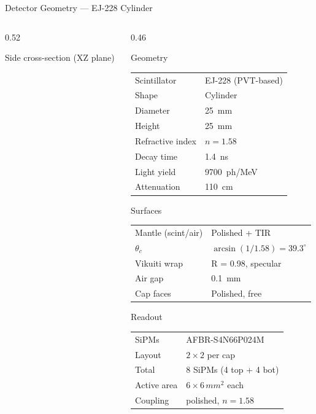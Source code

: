 \documentclass[aspectratio=169,10pt]{beamer}
\begin{document}
\begin{frame}{Detector Geometry — EJ-228 Cylinder}
\begin{columns}[T]
\begin{column}{0.52\textwidth}

  \vspace{0.3em}
  {\footnotesize Side cross-section (XZ plane)}
  \end{column}

  \begin{column}{0.46\textwidth}
  \small
  \begin{block}{Geometry}
    \begin{tabular}{@{}ll@{}}
      Scintillator & EJ-228 (PVT-based) \\
      Shape        & Cylinder \\
      Diameter     & \SI{25}{mm} \\
      Height       & \SI{25}{mm} \\
      Refractive index & $n = 1.58$ \\
      Decay time   & \SI{1.4}{ns} \\
      Light yield  & \SI{9700}{ph/MeV} \\
      Attenuation  & \SI{110}{cm} \\
    \end{tabular}
  \end{block}

  \begin{block}{Surfaces}
    \begin{tabular}{@{}ll@{}}
      Mantle (scint/air) & Polished + TIR \\
      $\theta_c$ & $\arcsin(1/1.58)=39.3^\circ$ \\
      Vikuiti wrap & R = 0.98, specular \\
      Air gap & \SI{0.1}{mm} \\
      Cap faces & Polished, free \\
    \end{tabular}
  \end{block}

  \begin{block}{Readout}
    \begin{tabular}{@{}ll@{}}
      SiPMs & AFBR-S4N66P024M \\
      Layout & $2\times2$ per cap \\
      Total & 8 SiPMs (4 top + 4 bot) \\
      Active area & $6\times6\,\si{mm^2}$ each \\
      Coupling & polished, $n=1.58$ \\
    \end{tabular}
  \end{block}
  \end{column}
\end{columns}

\end{frame}
\end{document}
